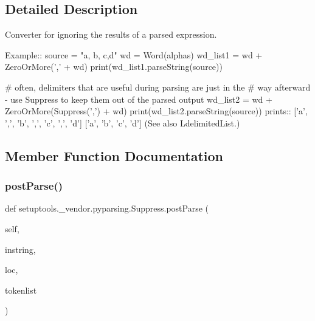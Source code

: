 \subsection{Detailed Description}
\begin{DoxyVerb}Converter for ignoring the results of a parsed expression.

Example::
    source = "a, b, c,d"
    wd = Word(alphas)
    wd_list1 = wd + ZeroOrMore(',' + wd)
    print(wd_list1.parseString(source))

    # often, delimiters that are useful during parsing are just in the
    # way afterward - use Suppress to keep them out of the parsed output
    wd_list2 = wd + ZeroOrMore(Suppress(',') + wd)
    print(wd_list2.parseString(source))
prints::
    ['a', ',', 'b', ',', 'c', ',', 'd']
    ['a', 'b', 'c', 'd']
(See also L{delimitedList}.)
\end{DoxyVerb}
 

\subsection{Member Function Documentation}
\mbox{\label{classsetuptools_1_1__vendor_1_1pyparsing_1_1Suppress_a99f780117a65983c3f486a3a0c5c7e73}} 
\subsubsection{\texorpdfstring{post\+Parse()}{postParse()}}
{\footnotesize\ttfamily def setuptools.\+\_\+vendor.\+pyparsing.\+Suppress.\+post\+Parse (\begin{DoxyParamCaption}\item[{}]{self,  }\item[{}]{instring,  }\item[{}]{loc,  }\item[{}]{tokenlist }\end{DoxyParamCaption})}

\mbox{\label{classsetuptools_1_1__vendor_1_1pyparsing_1_1Suppress_a92b705f99f29fbc08b3c1eadec9cc090}} 
